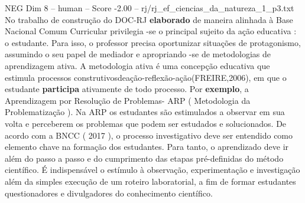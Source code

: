 \begin{textsample}{NEG Dim 8 – human – Score -2.00 – rj/rj\_ef\_ciencias\_da\_natureza\_1\_p3.txt}  \label{ex:f8_neg_006}
No trabalho de construção do DOC-RJ \textbf{elaborado} de maneira alinhada à Base Nacional Comum Curricular privilegia -se o principal sujeito da ação educativa : o estudante.
Para isso, o professor precisa oportunizar situações de protagonismo, assumindo o seu papel de mediador e apropriando -se de metodologias de aprendizagem ativa.
A metodologia ativa é uma concepção educativa que estimula processos construtivosdeação-reflexão-ação(FREIRE,2006), em que o estudante \textbf{participa} ativamente de todo processo.
Por \textbf{exemplo}, a Aprendizagem por Resolução de Problemas- ARP ( Metodologia da Problematização ).
Na ARP os estudantes são estimulados a observar em sua volta e perceberem os problemas que podem ser estudados e solucionados.
De acordo com a BNCC ( 2017 ), o processo investigativo deve ser entendido como elemento chave na formação dos estudantes.
Para tanto, o aprendizado deve ir além do passo a passo e do cumprimento das etapas pré-definidas do método científico. É indispensável o estímulo à observação, experimentação e investigação além da simples execução de um roteiro laboratorial, a fim de formar estudantes questionadores e divulgadores do conhecimento científico.

\end{textsample}
